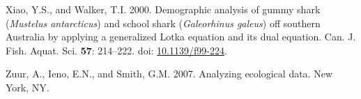\documentclass[
]{article}
\newenvironment{CSLReferences}%
  {}%
  {\par}
\begin{document}
\begin{CSLReferences}{1}{0}
Xiao, Y.S., and Walker, T.I. 2000. Demographic analysis of gummy shark (\emph{{Mustelus} antarcticus}) and school shark (\emph{{Galeorhinus} galeus}) off southern {Australia} by applying a generalized {Lotka} equation and its dual equation. Can. J. Fish. Aquat. Sci. \textbf{57}: 214--222. doi: \href{https://doi.org/10.1139/f99-224}{10.1139/f99-224}.

Zuur, A., Ieno, E.N., and Smith, G.M. 2007. Analyzing ecological data. New York, NY.

\end{CSLReferences}
\end{document}
